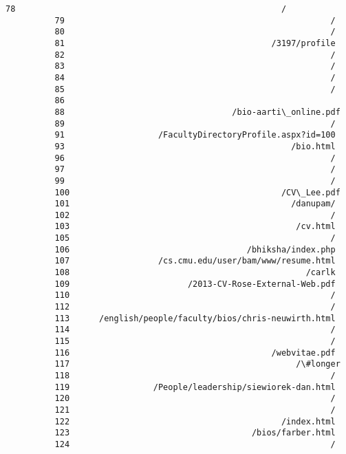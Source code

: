 \documentclass[11pt]{article}
\begin{document}
\begin{Verbatim}[commandchars=\\\{\}]
          78                                                      /
          79                                                      /
          80                                                      /
          81                                          /3197/profile
          82                                                      /
          83                                                      /
          84                                                      /
          85                                                      /
          86                                                       
          88                                  /bio-aarti\_online.pdf
          89                                                      /
          91                   /FacultyDirectoryProfile.aspx?id=100
          93                                              /bio.html
          96                                                      /
          97                                                      /
          99                                                      /
          100                                           /CV\_Lee.pdf
          101                                             /danupam/
          102                                                     /
          103                                              /cv.html
          105                                                     /
          106                                    /bhiksha/index.php
          107                  /cs.cmu.edu/user/bam/www/resume.html
          108                                                /carlk
          109                        /2013-CV-Rose-External-Web.pdf
          110                                                     /
          112                                                     /
          113      /english/people/faculty/bios/chris-neuwirth.html
          114                                                     /
          115                                                     /
          116                                         /webvitae.pdf
          117                                              /\#longer
          118                                                     /
          119                 /People/leadership/siewiorek-dan.html
          120                                                     /
          121                                                     /
          122                                           /index.html
          123                                     /bios/farber.html
          124                                                     /

\end{Verbatim}
\end{document}
